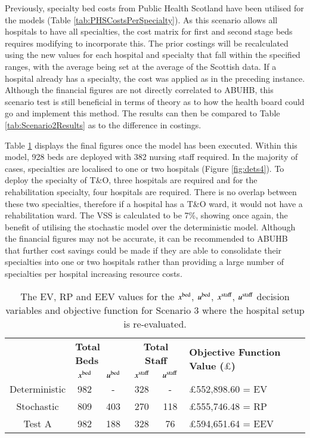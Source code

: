 \documentclass[../thesis.tex]{subfiles}
\begin{document}
Previously, specialty bed costs from Public Health Scotland have been utilised for the models (Table \ref{tab:PHSCostsPerSpecialty}). As this scenario allows all hospitals to have all specialties, the cost matrix for first and second stage beds requires modifying to incorporate this. The prior costings will be recalculated using the new values for each hospital and specialty that fall within the specified ranges, with the average being set at the average of the Scottish data. If a hospital already has a specialty, the cost was applied as in the preceding instance. Although the financial figures are not directly correlated to ABUHB, this scenario test is still beneficial in terms of theory as to how the health board could go and implement this method. The results can then be compared to Table \ref{tab:Scenario2Results} as to the difference in costings.

Table \ref{tab:Scenario3Results} displays the final figures once the model has been executed. Within this model, 928 beds are deployed with 382 nursing staff required. In the majority of cases, specialties are localised to one or two hospitals (Figure \ref{fig:dets4}). To deploy the specialty of T\&O, three hospitals are required and for the rehabilitation specialty, four hospitals are required. There is no overlap between these two specialties, therefore if a hospital has a T\&O ward, it would not have a rehabilitation ward. The VSS is calculated to be 7\%, showing once again, the benefit of utilising the stochastic model over the deterministic model. Although the financial figures may not be accurate, it can be recommended to ABUHB that further cost savings could be made if they are able to consolidate their specialties into one or two hospitals rather than providing a large number of specialties per hospital increasing resource costs.

\begin{table}[h!]
    \centering
    \begin{tabular}{cccccl}\toprule
 & \multicolumn{2}{l}{\textbf{Total Beds}} & \multicolumn{2}{c}{\textbf{Total Staff}} & \multirow{2}{*}{\textbf{Objective Function Value ($\pounds$)}}\\ \cmidrule(lr){2-3} \cmidrule(lr){4-5}
         
 & $x^\textnormal{bed}$           & $u^\textnormal{bed}$          & $x^\textnormal{staff}$         & $u^\textnormal{staff}$         \\ \midrule
 Deterministic & 982  & - & 328 & - &$\pounds$552,898.60 = EV \\
 Stochastic & 809 & 403 & 270 & 118 & $\pounds$555,746.48 = RP \\
 Test A & 982 & 188 & 328 & 76 & $\pounds$594,651.64 = EEV \\\bottomrule
    \end{tabular}
    \caption{The EV, RP and EEV values for the $x^\textnormal{bed}$, $u^\textnormal{bed}$, $x^\textnormal{staff}$, $u^\textnormal{staff}$ decision variables and objective function for Scenario 3 where the hospital setup is re-evaluated.}
\label{tab:Scenario3Results}
\end{table}
\end{document}
